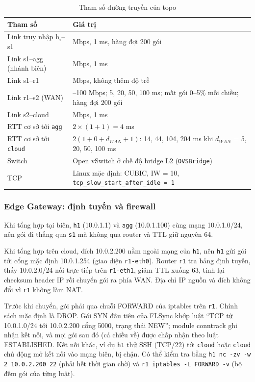 \begin{table}[H]
    \centering
    \caption{Tham số đường truyền của topo}
    \label{tab:params}
    \begin{tabularx}{\textwidth}{l >{\raggedright\arraybackslash}X}
        \toprule
        \textbf{Tham số} & \textbf{Giá trị} \\
        \midrule
        Link truy nhập h$_i$--s1 & 100 Mbps, 1 ms, hàng đợi 200 gói \\
        Link s1--agg (nhánh biên) & 100 Mbps, 1 ms \\
        Link s1--r1 & 100 Mbps, không thêm độ trễ \\
        Link r1--s2 (WAN) & 1--100 Mbps; 5, 20, 50, 100 ms; mất gói 0--5\% mỗi chiều; hàng đợi 200 gói \\
        Link s2--cloud & 100 Mbps, 1 ms \\
        RTT cơ sở tới \texttt{agg} & $2 \times (1+1) = 4$ ms \\
        RTT cơ sở tới \texttt{cloud} & $2 (1+0+d_{WAN}+1)$: 14, 44, 104, 204 ms khi $d_{WAN}$ = 5, 20, 50, 100 ms \\
        Switch & Open vSwitch ở chế độ bridge L2 (\texttt{OVSBridge}) \\
        TCP & Linux mặc định: CUBIC, IW = 10, \nolinkurl{tcp_slow_start_after_idle = 1} \\
        \bottomrule
    \end{tabularx}
\end{table}

\subsubsection{Edge Gateway: định tuyến và firewall}
Khi tổng hợp tại biên, \texttt{h1} (10.0.1.1) và \texttt{agg} (10.0.1.100) cùng mạng 10.0.1.0/24, nên gói đi thẳng qua \texttt{s1} mà không qua router và TTL giữ nguyên 64.

Khi tổng hợp trên cloud, đích 10.0.2.200 nằm ngoài mạng của \texttt{h1}, nên \texttt{h1} gửi gói tới cổng mặc định 10.0.1.254 (giao diện \texttt{r1-eth0}). Router \texttt{r1} tra bảng định tuyến, thấy 10.0.2.0/24 nối trực tiếp trên \texttt{r1-eth1}, giảm TTL xuống 63, tính lại checksum header IP rồi chuyển gói ra phía WAN. Địa chỉ IP nguồn và đích không đổi vì \texttt{r1} không làm NAT.

Trước khi chuyển, gói phải qua chuỗi FORWARD của iptables trên \texttt{r1}. Chính sách mặc định là DROP. Gói SYN đầu tiên của FLSync khớp luật ``TCP từ 10.0.1.0/24 tới 10.0.2.200 cổng 5000, trạng thái NEW''; module conntrack ghi nhận kết nối, và mọi gói sau đó (cả chiều về) được chấp nhận theo luật ESTABLISHED. Kết nối khác, ví dụ \texttt{h1} thử SSH (TCP/22) tới \texttt{cloud} hoặc \texttt{cloud} chủ động mở kết nối vào mạng biên, bị chặn. Có thể kiểm tra bằng \texttt{h1 nc -zv -w 2 10.0.2.200 22} (phải hết thời gian chờ) và \texttt{r1 iptables -L FORWARD -v} (bộ đếm gói của từng luật).

